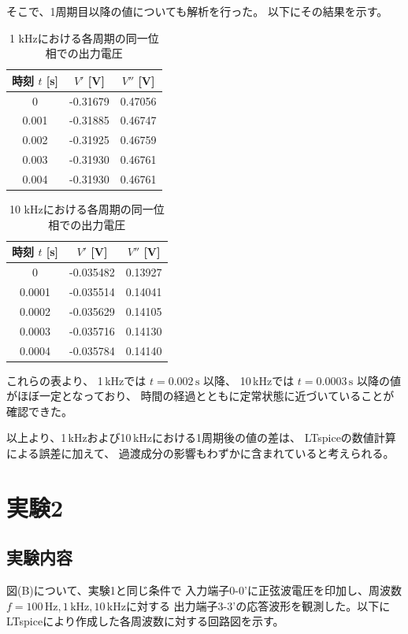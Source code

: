\documentclass[article]{jlreq}
\begin{document}
そこで、1周期目以降の値についても解析を行った。
以下にその結果を示す。
\begin{table}[H]
\centering
\caption{1 kHzにおける各周期の同一位相での出力電圧}
\begin{tabular}{ccc}
\toprule
時刻 $t$ [s] & $V'$ [V] & $V''$ [V] \\
\midrule
0      & -0.31679 & 0.47056 \\
0.001  & -0.31885 & 0.46747 \\
0.002  & -0.31925 & 0.46759 \\
0.003  & -0.31930 & 0.46761 \\
0.004  & -0.31930 & 0.46761 \\
\bottomrule
\end{tabular}
\end{table}

\begin{table}[H]
\centering
\caption{10 kHzにおける各周期の同一位相での出力電圧}
\begin{tabular}{ccc}
\toprule
時刻 $t$ [s]  & $V'$ [V] & $V''$ [V] \\
\midrule
0        & -0.035482 & 0.13927 \\
0.0001   & -0.035514 & 0.14041 \\
0.0002   & -0.035629 & 0.14105 \\
0.0003   & -0.035716 & 0.14130 \\
0.0004   & -0.035784 & 0.14140 \\
\bottomrule
\end{tabular}
\end{table}

これらの表より、
1\,kHzでは $t=0.002\,\mathrm{s}$ 以降、
10\,kHzでは $t=0.0003\,\mathrm{s}$ 以降の値がほぼ一定となっており、
時間の経過とともに定常状態に近づいていることが確認できた。

以上より、1\,kHzおよび10\,kHzにおける1周期後の値の差は、
LTspiceの数値計算による誤差に加えて、
過渡成分の影響もわずかに含まれていると考えられる。

\section{実験2}
\subsection{実験内容}
図(B)について、実験1と同じ条件で
入力端子0-0'に正弦波電圧を印加し、周波数$
f=100\,\mathrm{Hz}, 1\,\mathrm{kHz}, 10\,\mathrm{kHz}$に対する
出力端子3-3'の応答波形を観測した。以下にLTspiceにより作成した各周波数に対する回路図を示す。
\end{document}
